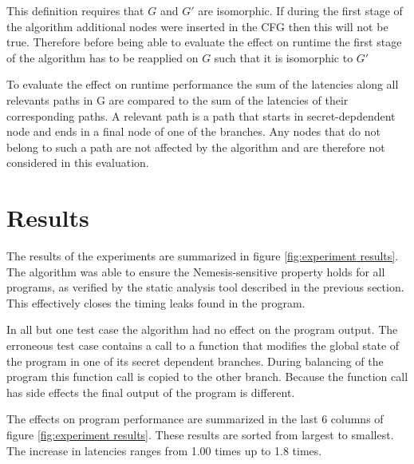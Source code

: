 This definition requires that $G$ and $G'$ are isomorphic. If during the first stage of the algorithm additional nodes were inserted in the CFG
then this will not be true. Therefore before being able to evaluate the effect on runtime the first stage of the algorithm has to be reapplied on $G$ such 
that it is isomorphic to $G'$

To evaluate the effect on runtime performance the sum of the latencies along all relevants paths in G are compared to the sum of the latencies of their corresponding paths. A relevant path is a path that starts in secret-depdendent node and ends in a final node of one of the branches. Any nodes that do not belong to such a path 
are not affected by the algorithm and are therefore not considered in this evaluation. 

    
\section{Results}

The results of the experiments are summarized in figure \ref{fig:experiment results}.
The algorithm was able to ensure the Nemesis-sensitive property holds for all programs, as verified by the static analysis tool described in the previous section. This effectively closes the 
timing leaks found in the program. 

In all but one test case the algorithm had no effect on the program output. 
The erroneous test case contains a call to a function that modifies the global state of the program in one of its secret dependent branches. 
During balancing of the program this function call is copied to the other branch. 
Because the function call has side effects the final output of the program is different. 

The effects on program performance are summarized in the last 6 columns of figure \ref{fig:experiment results}. 
These results are sorted from largest to smallest. 
The increase in latencies ranges from 1.00 times up to 1.8 times. 

